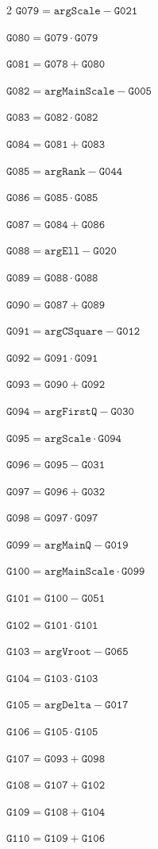 \documentclass[10pt]{article}
\begin{document}
\begin{multicols}{2}
\noindent $\mathtt{G079}=\mathtt{argScale}-\mathtt{G021}$\par
\noindent $\mathtt{G080}=\mathtt{G079}\cdot \mathtt{G079}$\par
\noindent $\mathtt{G081}=\mathtt{G078}+\mathtt{G080}$\par
\noindent $\mathtt{G082}=\mathtt{argMainScale}-\mathtt{G005}$\par
\noindent $\mathtt{G083}=\mathtt{G082}\cdot \mathtt{G082}$\par
\noindent $\mathtt{G084}=\mathtt{G081}+\mathtt{G083}$\par
\noindent $\mathtt{G085}=\mathtt{argRank}-\mathtt{G044}$\par
\noindent $\mathtt{G086}=\mathtt{G085}\cdot \mathtt{G085}$\par
\noindent $\mathtt{G087}=\mathtt{G084}+\mathtt{G086}$\par
\noindent $\mathtt{G088}=\mathtt{argEll}-\mathtt{G020}$\par
\noindent $\mathtt{G089}=\mathtt{G088}\cdot \mathtt{G088}$\par
\noindent $\mathtt{G090}=\mathtt{G087}+\mathtt{G089}$\par
\noindent $\mathtt{G091}=\mathtt{argCSquare}-\mathtt{G012}$\par
\noindent $\mathtt{G092}=\mathtt{G091}\cdot \mathtt{G091}$\par
\noindent $\mathtt{G093}=\mathtt{G090}+\mathtt{G092}$\par
\noindent $\mathtt{G094}=\mathtt{argFirstQ}-\mathtt{G030}$\par
\noindent $\mathtt{G095}=\mathtt{argScale}\cdot \mathtt{G094}$\par
\noindent $\mathtt{G096}=\mathtt{G095}-\mathtt{G031}$\par
\noindent $\mathtt{G097}=\mathtt{G096}+\mathtt{G032}$\par
\noindent $\mathtt{G098}=\mathtt{G097}\cdot \mathtt{G097}$\par
\noindent $\mathtt{G099}=\mathtt{argMainQ}-\mathtt{G019}$\par
\noindent $\mathtt{G100}=\mathtt{argMainScale}\cdot \mathtt{G099}$\par
\noindent $\mathtt{G101}=\mathtt{G100}-\mathtt{G051}$\par
\noindent $\mathtt{G102}=\mathtt{G101}\cdot \mathtt{G101}$\par
\noindent $\mathtt{G103}=\mathtt{argVroot}-\mathtt{G065}$\par
\noindent $\mathtt{G104}=\mathtt{G103}\cdot \mathtt{G103}$\par
\noindent $\mathtt{G105}=\mathtt{argDelta}-\mathtt{G017}$\par
\noindent $\mathtt{G106}=\mathtt{G105}\cdot \mathtt{G105}$\par
\noindent $\mathtt{G107}=\mathtt{G093}+\mathtt{G098}$\par
\noindent $\mathtt{G108}=\mathtt{G107}+\mathtt{G102}$\par
\noindent $\mathtt{G109}=\mathtt{G108}+\mathtt{G104}$\par
\noindent $\mathtt{G110}=\mathtt{G109}+\mathtt{G106}$\par
\end{multicols}
\end{document}
